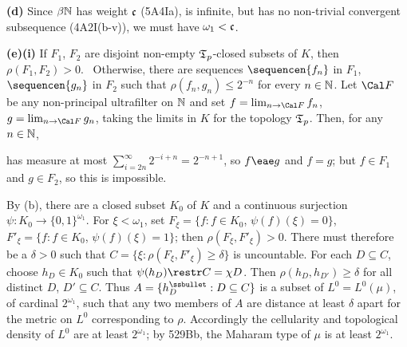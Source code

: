 {\medskip

{\bf (d)} Since $\beta\Bbb N$ has weight $\frak c$ (5A4Ia), is infinite,
but has no non-trivial convergent subsequence (4A2I(b-v)), we must have
$\omega_1<\frak c$.

\medskip

{\bf (e)(i)} If $F_1$, $F_2$ are disjoint non-empty $\frak T_p$-closed
subsets of $K$, then $\rho(F_1,F_2)>0$.   \Prf\Quer\ Otherwise, there
are sequences $\sequencen{f_n}$ in $F_1$, $\sequencen{g_n}$ in $F_2$
such that $\rho(f_n,g_n)\le 2^{-n}$ for every $n\in\Bbb N$.   Let
$\Cal F$ be any non-principal ultrafilter on
$\Bbb N$ and set $f=\lim_{n\to\Cal F}f_n$, $g=\lim_{n\to\Cal F}g_n$,
taking the limits in $K$ for the topology $\frak T_p$.   Then, for any
$n\in\Bbb N$,


\noindent has measure at most $\sum_{i=2n}^{\infty}2^{-i+n}=2^{-n+1}$,
so $f\eae g$ and $f=g$;  but $f\in F_1$ and $g\in F_2$, so this is
impossible.\ \Bang\Qed

\medskip

 By (b), there are a closed subset $K_0$ of $K$ and a
continuous surjection $\psi:K_0\to\{0,1\}^{\omega_1}$.   For
$\xi<\omega_1$, set $F_{\xi}=\{f:f\in K_0$, $\psi(f)(\xi)=0\}$,
$F'_{\xi}=\{f:f\in K_0$, $\psi(f)(\xi)=1\}$;  then
$\rho(F_{\xi},F'_{\xi})>0$.   There must therefore be a $\delta>0$ such
that $C=\{\xi:\rho(F_{\xi},F'_{\xi})\ge\delta\}$ is uncountable.   For
each $D\subseteq C$, choose $h_D\in K_0$ such that
$\psi(h_D)\restr C=\chi D$.   Then $\rho(h_D,h_{D'})\ge\delta$ for all
distinct $D$, $D'\subseteq C$.   Thus
$A=\{h_D^{\ssbullet}:D\subseteq C\}$ is a subset of $L^0=L^0(\mu)$, of
cardinal $2^{\omega_1}$, such that any two members of $A$ are distance
at least $\delta$ apart for the metric on $L^0$ corresponding to $\rho$.
Accordingly the cellularity and topological density of $L^0$ are at
least $2^{\omega_1}$;  by 529Bb, the Maharam type of $\mu$ is at least
$2^{\omega_1}$.

\medskip

}
